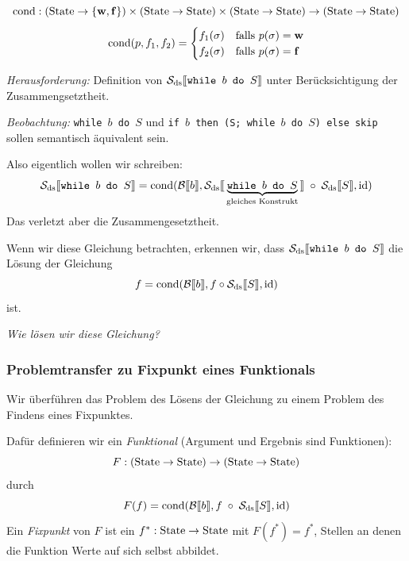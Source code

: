 \begin{definition}[cond] \label{def:cond}
    \[
        \cond : (\State \to \bool) \times (\State \to \State) \times (\State \to \State) \to (\State \to \State)
    \]
    \[
        \cond(p, f_1, f_2) = \begin{cases}
            f_1(\sigma) & \text{falls } p(\sigma) = \true \\
            f_2(\sigma) & \text{falls } p(\sigma) = \false
        \end{cases}
    \]
\end{definition}

\par\bigskip
\emph{Herausforderung:} Definition von $\Sdssem{\texttt{while $b$ do $S$}}$ unter Berücksichtigung der Zusammengsetztheit.

\emph{Beobachtung:} \texttt{while $b$ do $S$} und \texttt{if $b$ then (S; while $b$ do $S$) else skip} sollen semantisch äquivalent sein.

Also eigentlich wollen wir schreiben: \[
    \Sdssem{\texttt{while $b$ do $S$}} = \cond(\Bsem{b}, \Sdssem{\underbrace{\texttt{while $b$ do $S$}}_{\text{gleiches Konstrukt}}} \;\circ\; \Sdssem{S}, \id)
\]
Das verletzt aber die Zusammengesetztheit.

\par\medskip
\begin{remark}[Erkenntnis]
    Wenn wir diese Gleichung betrachten, erkennen wir, dass
    $\Sdssem{\texttt{while $b$ do $S$}}$ die Lösung der Gleichung \[
        f = \cond(\Bsem{b}, f \circ \Sdssem{S}, \id)
    \]
    ist.
\end{remark}

\emph{Wie lösen wir diese Gleichung?}



\subsubsection{Problemtransfer zu Fixpunkt eines Funktionals}

Wir überführen das Problem des Lösens der Gleichung zu einem Problem des Findens eines Fixpunktes.

\begin{definition}[Funktional] \label{def:funktional}
    Dafür definieren wir ein \emph{Funktional} (Argument und Ergebnis sind Funktionen): \[
        F : (\State \to \State) \to (\State \to \State)
    \] durch \[
        F(f) = \cond(\Bsem{b}, f \;\circ\; \Sdssem{S}, \id)
    \]
    Ein \emph{Fixpunkt} von $F$ ist ein $f^* : \State \to \State$ mit $F(f^*) = f^*$, \dh{} Stellen an denen die Funktion Werte auf sich selbst abbildet.
\end{definition}

